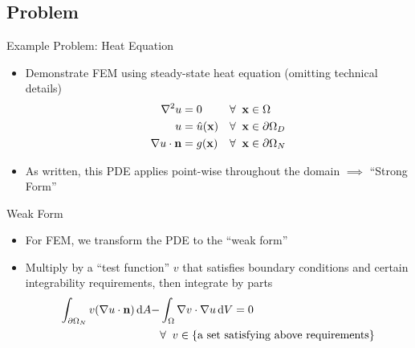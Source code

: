 \subsection{Problem}
\begin{frame}{Example Problem: Heat Equation}
  \begin{itemize}
  \item
    Demonstrate FEM using steady-state heat equation (omitting technical details)
    \begin{align*}
      \nabla^2 u &= 0 &\forall \;\;\mathbf{x}&\in \Omega \\
      u &= \hat{u}(\mathbf{x}) &\forall \;\;\mathbf{x} &\in \partial \Omega_D \\
      \nabla u \cdot \mathbf{n} &= g(\mathbf{x}) &\forall \;\; \mathbf{x} &\in \partial \Omega_N
    \end{align*}
  \item
    As written, this PDE applies point-wise throughout the domain $\implies$ ``Strong Form''
  \end{itemize}
\end{frame}


\begin{frame}{Weak Form}

  \begin{itemize}
  \item
    For FEM, we transform the PDE to the ``weak form''
  \item
    Multiply by a ``test function'' $v$ that satisfies boundary conditions and 
    certain integrability requirements, then integrate by parts
    \begin{align*}
      \int_{\partial \Omega_N} v (\nabla u \cdot \mathbf{n})\,\mathrm{d}A - 
      &\int_{\Omega} \nabla v \cdot \nabla u \,\mathrm{d}V = 0  \\
      &\forall\;\; v \in 
      \{\text{a set satisfying above requirements}\}
    \end{align*}
  \end{itemize}

\end{frame}


